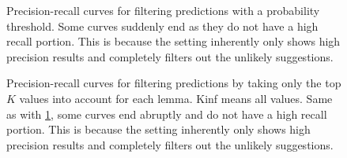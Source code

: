 \begin{figure}[h]
\centering

\begin{subfigure}[t]{0.5\textwidth}
\centering

\end{subfigure}%
%
\begin{subfigure}[t]{0.5\textwidth}
\centering

\end{subfigure}

\begin{subfigure}[t]{0.5\textwidth}
\centering

\end{subfigure}%
%
\begin{subfigure}[t]{0.5\textwidth}
\centering

\end{subfigure}

\caption{Precision-recall curves for filtering predictions with a probability threshold. Some curves suddenly end as they do not have a high recall portion. This is because the setting inherently only shows high precision results and completely filters out the unlikely suggestions.}
\label{fig:agg_thr}
\end{figure}



\begin{figure}[h]
\centering

\begin{subfigure}[t]{0.5\textwidth}
\centering

\end{subfigure}%
%
\begin{subfigure}[t]{0.5\textwidth}
\centering

\end{subfigure}

\begin{subfigure}[t]{0.5\textwidth}
\centering

\end{subfigure}%
%
\begin{subfigure}[t]{0.5\textwidth}
\centering

\end{subfigure}

\caption{Precision-recall curves for filtering predictions by taking only the top $K$ values into account for each lemma. Kinf means all values. Same as with \cref{fig:agg_thr}, some curves end abruptly and do not have a high recall portion. This is because the setting inherently only shows high precision results and completely filters out the unlikely suggestions. }
\label{fig:agg_prek}
\end{figure}

